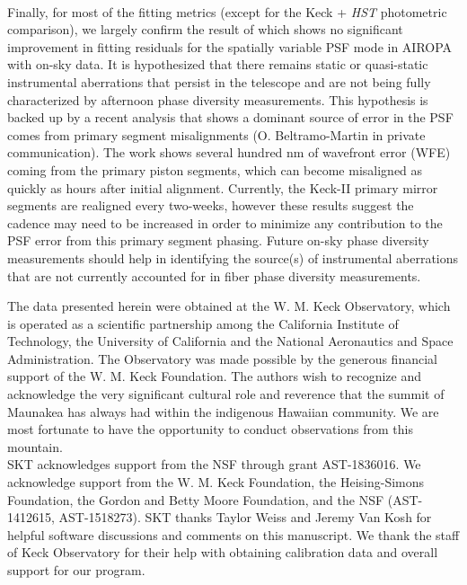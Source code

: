 \documentclass[]{spie}  %
\begin{document}
\\
\indent Finally, for most of the fitting metrics (except for the Keck + \textit{HST} photometric comparison), we largely confirm the result of \cite{Turri:inprep} which shows no significant improvement in fitting residuals for the spatially variable PSF mode in AIROPA with on-sky data. It is hypothesized that there remains static or quasi-static instrumental aberrations that persist in the telescope and are not being fully characterized by afternoon phase diversity measurements. This hypothesis is backed up by a recent analysis that shows a dominant source of error in the PSF comes from primary segment misalignments (O. Beltramo-Martin in private communication). The work shows several hundred nm of wavefront error (WFE) coming from the primary piston segments, which can become misaligned as quickly as hours after initial alignment. Currently, the Keck-II primary mirror segments are realigned every two-weeks, however these results suggest the cadence may need to be increased in order to minimize any contribution to the PSF error from this primary segment phasing. Future on-sky phase diversity measurements should help in identifying the source(s) of instrumental aberrations that are not currently accounted for in fiber phase diversity measurements. 

\acknowledgments

The data presented herein were obtained at the W. M. Keck Observatory, which is operated as a scientific partnership among the California Institute of Technology, the University of California and the National Aeronautics and Space Administration.
The Observatory was made possible by the generous financial support of the W. M. Keck Foundation.
The authors wish to recognize and acknowledge the very significant cultural role and reverence that the summit of Maunakea has always had within the indigenous Hawaiian community.
We are most fortunate to have the opportunity to conduct observations from this mountain.
\\
\indent SKT acknowledges support from the NSF through grant AST-1836016. We acknowledge support from the W. M. Keck Foundation, the Heising-Simons Foundation, the Gordon and Betty Moore Foundation, and the NSF (AST-1412615, AST-1518273). SKT thanks Taylor Weiss and Jeremy Van Kosh for helpful software discussions and comments on this manuscript. We thank the staff of Keck Observatory for their help with obtaining calibration data and overall support for our program.

\end{document}

